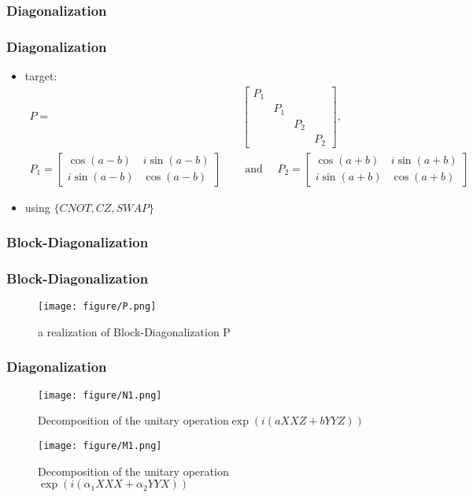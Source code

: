 \subsubsection{Diagonalization}
\begin{frame}
\frametitle{Diagonalization}
\begin{itemize}
  \item target:
  \begin{align}
    P=&\begin{bmatrix}
      P_1 &&\\
      &P_1 &&\\
      &&P_2&\\
      &&&P_2
    \end{bmatrix}
    ,\\P_{1}=\begin{bmatrix}
        \cos (a-b) & i \sin (a-b) \\
        i \sin (a-b) & \cos (a-b)
        \end{bmatrix} \quad &\text { and } \quad 
        P_{2}=\begin{bmatrix}
        \cos (a+b) & i \sin (a+b) \\
        i \sin (a+b) & \cos (a+b)
        \end{bmatrix}
  \end{align}
  \item using $\{CNOT,CZ,SWAP\}$
\end{itemize}
\end{frame}
\subsubsection{Block-Diagonalization}
\begin{frame}
\frametitle{Block-Diagonalization}
\begin{figure}
  \texttt{[image: figure/P.png]}
  \caption{a realization of Block-Diagonalization P}
\end{figure}
\end{frame}
\begin{frame}
  \frametitle{Diagonalization\cite{}}
  \begin{figure}
    \texttt{[image: figure/N1.png]}
    \caption{Decomposition of the unitary operation$\exp(i(a XXZ+b YYZ))$}
  \end{figure}

  \begin{figure}
    \texttt{[image: figure/M1.png]}
    \caption{Decomposition of the unitary operation $\exp(i(\alpha_1 XXX+\alpha_2 YYX))$}
  \end{figure}
\end{frame}


